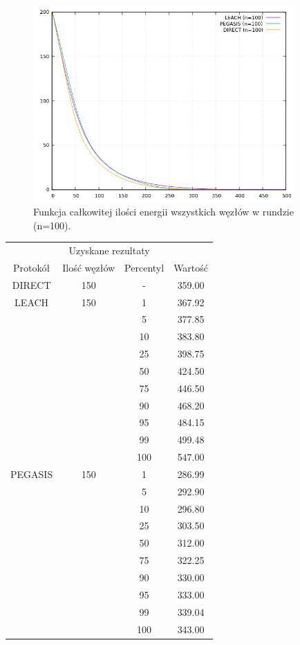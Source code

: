 \documentclass[a4paper,12pt,twoside,openany]{report}
\begin{document}
\begin{figure}[H]
 \centering
 \includegraphics[width=10cm]{images/gnuplot/test_2/energy_in_round_100.png}
 \caption{Funkcja całkowitej ilości energii wszystkich węzłów w rundzie (n=100).}
\end{figure}

\begin{longtable}{*{4}{c}}
\toprule
\multicolumn{4}{c}{Uzyskane rezultaty} \\
Protokół	& Ilość węzłów	& Percentyl	& Wartość \\
\midrule
\endhead
DIRECT	& 150 	& -	& 359.00 \\*
\midrule
LEACH	& 150	& 1	& 367.92 \\*
	&	& 5	& 377.85 \\*
	&	& 10	& 383.80 \\*
	&	& 25	& 398.75 \\*
	&	& 50	& 424.50 \\*
	&	& 75	& 446.50 \\*
	&	& 90	& 468.20 \\*
	&	& 95	& 484.15 \\*
	&	& 99	& 499.48 \\*
	&	& 100	& 547.00 \\*
\midrule
PEGASIS	& 150	& 1	& 286.99 \\*
	&	& 5	& 292.90 \\*
	&	& 10	& 296.80 \\*
	&	& 25	& 303.50 \\*
	&	& 50	& 312.00 \\*
	&	& 75	& 322.25 \\*
	&	& 90	& 330.00 \\*
	&	& 95	& 333.00 \\*
	&	& 99	& 339.04 \\*
	&	& 100	& 343.00 \\*
\bottomrule
\end{longtable}
\end{document}
